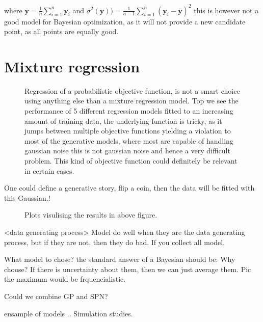 where $\bar{\textbf{y}} = \frac{1}{n}\sum_{i=1}^n \textbf{y}_i $ and 
$\bar{\sigma}^2 (\textbf{y})) = \frac{1}{n-1}\sum_{i=1}^n (\textbf{y}_i-\bar{\textbf{y}})^2 $
this is however not a good model for Bayesian optimization, as it will not provide a
new candidate point, as all points are equally good. 


\section{Mixture regression}

\begin{figure}
  \caption{Regression of a probabilistic objective function, is not a smart choice
  using anything else than a mixture regression model. Top we see the performance
  of 5 different regression models fitted to an increasing amount of training data, 
  the underlying function is tricky, as it jumps between multiple objective functions
  yielding a violation to most of the generative models, where most are capable of
  handling gaussian noise this is not gaussian noise and hence a very difficult problem. 
  This kind of objective function could definitely be relevant in certain cases.}
\end{figure}

One could define a generative story, flip a coin, then the data will
be fitted with this Gaussian.! 

\begin{figure}
  \caption{Plots visulising the results in above figure.}
\end{figure}

<data generating process>
Model do well when they are the data generating process, but if they are not, then
they do bad. If you collect all model, 

What model to chose? the standard answer of a Bayesian should be: Why choose? If there 
is uncertainty about them, then we can just average them. Pic the maximum would be frquencialistic.

Could we combine GP and SPN?

ensample of models ..
Simulation studies. 



